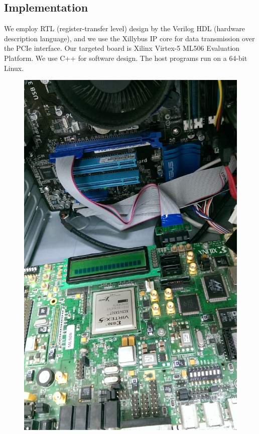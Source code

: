 \documentclass{acm_proc_article-sp}
\begin{document}
\subsection{Implementation}
We employ RTL (register-transfer level) design by the Verilog HDL (hardware description language), and we use the Xillybus IP core \cite{fpga_ref} for data transmission over the PCIe interface. Our targeted board is Xilinx Virtex-5 ML506 Evaluation Platform. We use C++ for software design. The host programs run on a 64-bit Linux.
\begin{figure}[H]
  \includegraphics[width=\linewidth,natwidth=600,natheight=984]{fpga_connect.jpg}
  \label{fig:fpga_connect}
\end{figure}
\end{document}
